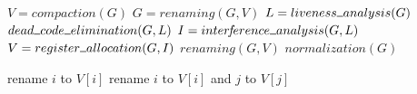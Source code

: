 \documentclass[]{article}
\let\oldnl\nl%
\newcommand{\nonl}{\renewcommand{\nl}{\let\nl\oldnl}}%
\newcommand{\Xund}{\rule{.5em}{.5pt}}
\begin{document}
\begin{algorithm}[H] \DontPrintSemicolon {} 
\begin{multicols}{2}
\small

\Indm

\nonl{} {
    $V = compaction(G)$ \;
    $G = renaming(G, V)$ \;
     {
        $L = liveness \Xund analysis(G)$ \;
        $dead \Xund code \Xund elimination(G, L)$ \;
        $I = inter\!f\!erence \Xund analysis(G, L)$ \;
        $V = register \Xund allocation (G, I)$ \;
        $renaming(G, V)$ \;
        $normalization(G)$ \;
    }
}
\vspace{2em}

\nonl{} {
     {
         {
             {
                rename $i$ to $V[i]$ \;
            }
             {
                rename $i$ to $V[i]$ and $j$ to $V[j]$ \;
            }
        }
    }
}
\vspace{2em}


\end{multicols}
\end{algorithm}
\end{document}
